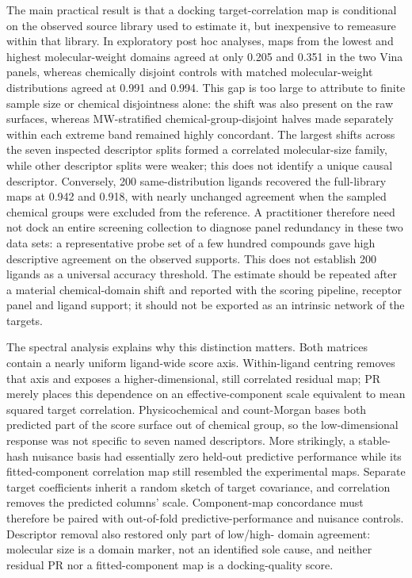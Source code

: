 \documentclass[11pt]{article}
\begin{document}
The main practical result is that a docking target-correlation map is conditional on the
observed source library used to estimate it, but inexpensive to remeasure within that library.
In exploratory post hoc analyses, maps from the lowest and highest molecular-weight domains agreed at only 0.205 and 0.351 in
the two Vina panels, whereas chemically disjoint controls with matched molecular-weight
distributions agreed at 0.991 and 0.994. This gap is too large to attribute to finite sample
size or chemical disjointness alone: the shift was also present on the raw surfaces, whereas
MW-stratified chemical-group-disjoint halves made separately within each extreme band
remained highly concordant. The largest shifts across the seven inspected descriptor
splits formed a correlated molecular-size family, while other descriptor splits were weaker;
this does not identify a unique causal descriptor. Conversely, 200 same-distribution ligands recovered the
full-library maps at 0.942 and 0.918, with nearly unchanged agreement when the sampled
chemical groups were excluded from the reference. A practitioner therefore need not dock an
entire screening collection to diagnose panel redundancy in these two data sets: a representative probe set of a
few hundred compounds gave high descriptive agreement on the observed supports. This does
not establish 200 ligands as a universal accuracy threshold. The estimate should be repeated after a
material chemical-domain shift and reported with the scoring pipeline, receptor panel and
ligand support; it should not be exported as an intrinsic network of the targets.

The spectral analysis explains why this distinction matters. Both matrices contain a nearly
uniform ligand-wide score axis. Within-ligand centring removes that axis and exposes a
higher-dimensional, still correlated residual map; PR merely places this dependence on an
effective-component scale equivalent to mean squared target correlation. Physicochemical
and count-Morgan bases both predicted part of the score surface out of chemical group, so
the low-dimensional response was not specific to seven named descriptors. More strikingly,
a stable-hash nuisance basis had essentially zero held-out predictive performance while its
fitted-component correlation map still resembled the experimental maps. Separate target
coefficients inherit a random sketch of target covariance, and correlation removes the
predicted columns' scale. Component-map concordance must therefore be paired with out-of-fold
predictive-performance and nuisance controls. Descriptor removal also restored only part of low/high-
domain agreement: molecular size is a domain marker, not an identified sole cause, and
neither residual PR nor a fitted-component map is a docking-quality score.
\end{document}
